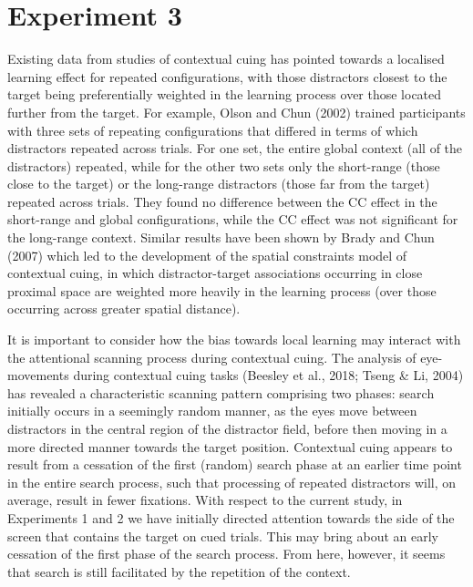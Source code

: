 \documentclass[
  man,
  floatsintext,
  longtable,
  nolmodern,
  notxfonts,
  notimes,
  colorlinks=true,linkcolor=blue,citecolor=blue,urlcolor=blue]{apa7}
\begin{document}
\section{Experiment 3}\label{experiment-3}

Existing data from studies of contextual cuing has pointed towards a
localised learning effect for repeated configurations, with those
distractors closest to the target being preferentially weighted in the
learning process over those located further from the target. For
example, Olson and Chun (2002) trained participants with three sets of
repeating configurations that differed in terms of which distractors
repeated across trials. For one set, the entire global context (all of
the distractors) repeated, while for the other two sets only the
short-range (those close to the target) or the long-range distractors
(those far from the target) repeated across trials. They found no
difference between the CC effect in the short-range and global
configurations, while the CC effect was not significant for the
long-range context. Similar results have been shown by Brady and Chun
(2007) which led to the development of the spatial constraints model of
contextual cuing, in which distractor-target associations occurring in
close proximal space are weighted more heavily in the learning process
(over those occurring across greater spatial distance).

It is important to consider how the bias towards local learning may
interact with the attentional scanning process during contextual cuing.
The analysis of eye-movements during contextual cuing tasks (Beesley et
al., 2018; Tseng \& Li, 2004) has revealed a characteristic scanning
pattern comprising two phases: search initially occurs in a seemingly
random manner, as the eyes move between distractors in the central
region of the distractor field, before then moving in a more directed
manner towards the target position. Contextual cuing appears to result
from a cessation of the first (random) search phase at an earlier time
point in the entire search process, such that processing of repeated
distractors will, on average, result in fewer fixations. With respect to
the current study, in Experiments 1 and 2 we have initially directed
attention towards the side of the screen that contains the target on
cued trials. This may bring about an early cessation of the first phase
of the search process. From here, however, it seems that search is still
facilitated by the repetition of the context.
\end{document}
